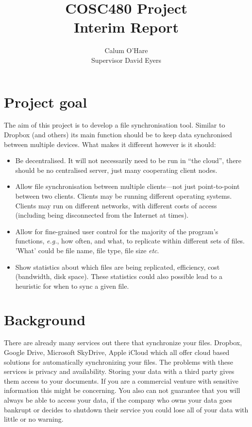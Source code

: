 \documentclass[12pt]{article}
\title{COSC480 Project \\ Interim Report}
\author{Calum O'Hare \\ Supervisor David Eyers}
\date{}
\begin{document}
\maketitle

\section{Project goal}
The aim of this project is to develop a file synchronisation tool.
Similar to  Dropbox (and others) its main function should be to
keep data synchronised between multiple devices.
What makes it different however is it should:
\begin{itemize}
\item Be decentralised. It will not necessarily need to be run in ``the cloud'', there should be
no centralised server, just many cooperating client nodes.

\item Allow file synchronisation between multiple clients---not just point-to-point between two clients. Clients may be
running different operating systems. Clients may run on different networks, with different costs of access (including being disconnected from the Internet at times).

\item Allow for fine-grained user control for the majority of the program's
functions, \emph{e.g.}, how often, and what, to replicate within different sets of files. 'What' could be file name, file type, file size \emph{etc}.

\item Show statistics about which files are being replicated, efficiency,
cost (bandwidth, disk space). These statistics could also possible lead
to a heuristic for when to sync a given file.
\end{itemize}
\section{Background}
There are already many services out there that synchronize your
files. Dropbox, Google Drive, Microsoft SkyDrive, Apple iCloud
which all offer cloud based solutions for automatically
synchronizing your files. The problems with these
services is privacy and availability. Storing your data with a
third party gives them access to your documents. If you
are a commercial venture with sensitive information
this might be concerning. You also can not guarantee
that you will always be able to access your data, if
the company who owns your data goes bankrupt or
decides to shutdown their service you could lose all
of your data with little or no warning. 
\end{document}
